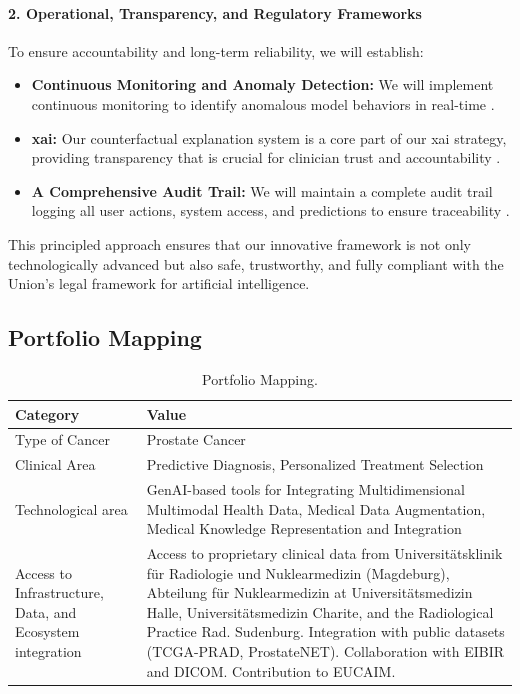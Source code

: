 \documentclass[11pt, a4paper]{article}
\begin{document}
\begin{itemize}
\paragraph{2. Operational, Transparency, and Regulatory Frameworks}
To ensure accountability and long-term reliability, we will establish:
\begin{itemize}
    \item \textbf{Continuous Monitoring and Anomaly Detection:} We will implement continuous monitoring to identify anomalous model behaviors in real-time \cite{AlAttar2023,GarcaGmezBlanesSelva2023}.
    \item \textbf{\gls{xai}:} Our counterfactual explanation system is a core part of our \gls{xai} strategy, providing transparency that is crucial for clinician trust and accountability \cite{GarcaGmezBlanesSelva2023,JamesIjiga2024}.
    \item \textbf{A Comprehensive Audit Trail:} We will maintain a complete audit trail logging all user actions, system access, and predictions to ensure traceability \cite{GarcaGmezBlanesSelva2023,KhadkaEpiphaniou2025}.
\end{itemize}
\end{itemize}

This principled approach ensures that our innovative framework is not only technologically advanced but also safe, trustworthy, and fully compliant with the Union's legal framework for artificial intelligence.

\subsection{Portfolio Mapping}
\begin{table}[H]
    \centering
    \caption{Portfolio Mapping.}
    \label{tab:portfolio_mapping}
    \small
    \begin{tabular}{p{} p{}}
        \toprule
        \textbf{Category} & \textbf{Value} \\
        \midrule
        Type of Cancer & Prostate Cancer \\
        \midrule
        Clinical Area & Predictive Diagnosis, Personalized Treatment Selection \\
        \midrule
        Technological area & GenAI-based tools for Integrating Multidimensional Multimodal Health Data, Medical Data Augmentation, Medical Knowledge Representation and Integration \\
        \midrule
        Access to Infrastructure, Data, and Ecosystem integration & Access to proprietary clinical data from Universitätsklinik für Radiologie und Nuklearmedizin (Magdeburg), Abteilung für Nuklearmedizin at Universitätsmedizin Halle, Universitätsmedizin Charite, and the Radiological Practice Rad. Sudenburg. Integration with public datasets (TCGA-PRAD, ProstateNET). Collaboration with EIBIR and DICOM. Contribution to EUCAIM. \\
        \bottomrule
    \end{tabular}
\end{table}
\end{document}
